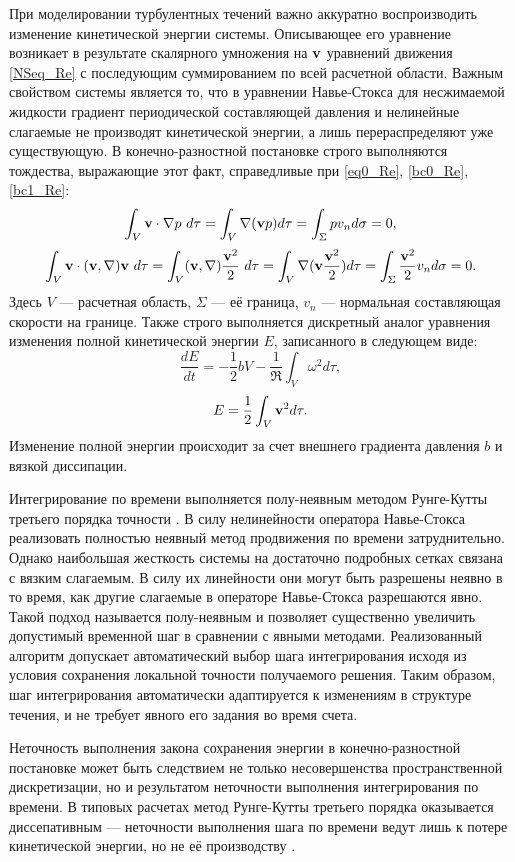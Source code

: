 При моделировании турбулентных течений важно аккуратно воспроизводить изменение кинетической энергии системы. Описывающее его уравнение возникает в результате скалярного умножения на $\mathbf{v}$ уравнений движения \eqref{NSeq_Re} с последующим суммированием по всей расчетной области. Важным свойством системы является то, что в уравнении Навье-Стокса для несжимаемой жидкости градиент периодической составляющей давления и нелинейные слагаемые не производят кинетической энергии, а лишь перераспределяют уже существующую. В конечно-разностной постановке строго выполняются тождества, выражающие этот факт, справедливые при \eqref{eq0_Re}, \eqref{bc0_Re}, \eqref{bc1_Re}:
$$
\int_V \mathbf{v} \cdot \nabla p\ d\tau= \int_V \nabla (\mathbf{v} p) d\tau = \int_{\Sigma} p v_n d\sigma = 0, 
$$
$$
\int_V \mathbf{v} \cdot (\mathbf{v}, \nabla) \mathbf{v}\ d\tau = \int_V (\mathbf{v}, \nabla)\frac{\mathbf{v}^2}{2}\ d\tau = \int_V \nabla (\mathbf{v} \frac{\mathbf{v}^2}{2}) d\tau = \int_{\Sigma} \frac{\mathbf{v}^2}{2} v_n d\sigma = 0.
$$
Здесь $V$ --- расчетная область, $\Sigma$ --- её граница, $v_n$ --- нормальная составляющая скорости на границе. Также строго выполняется дискретный аналог уравнения изменения полной кинетической энергии $E$, записанного в следующем виде:
\begin{equation} \label{Eeq}
\frac{d E}{d t} = - \frac{1}{2}bV - \frac{1}{\Re} \int_{V} \omega^2 d\tau,
\end{equation}
$$
E = \frac{1}{2}\int_{V} \mathbf{v}^2 d\tau.
$$
Изменение полной энергии происходит за счет внешнего градиента давления $b$ и вязкой диссипации. 

Интегрирование по времени выполняется полу-неявным методом Рунге-Кутты третьего порядка точности \cite{Nikitin2006third}. В силу нелинейности оператора Навье-Стокса реализовать полностью неявный метод продвижения по времени затруднительно. Однако наибольшая жесткость системы на достаточно подробных сетках связана с вязким слагаемым. В силу их линейности они могут быть разрешены неявно в то время, как другие слагаемые в операторе Навье-Стокса разрешаются явно. Такой подход называется полу-неявным и позволяет существенно увеличить допустимый временной шаг в сравнении с явными методами. Реализованный алгоритм допускает автоматический выбор шага интегрирования исходя из условия сохранения локальной точности получаемого решения. Таким образом, шаг интегрирования автоматически адаптируется к изменениям в структуре течения, и не требует явного его задания во время счета. 

Неточность выполнения закона сохранения энергии в конечно-разностной постановке может быть следствием не только несовершенства пространственной дискретизации, но и результатом неточности выполнения интегрирования по времени. В типовых расчетах метод Рунге-Кутты третьего порядка оказывается диссепативным --- неточности выполнения шага по времени ведут лишь к потере кинетической энергии, но не её производству \cite{Nikitin2006}. 

